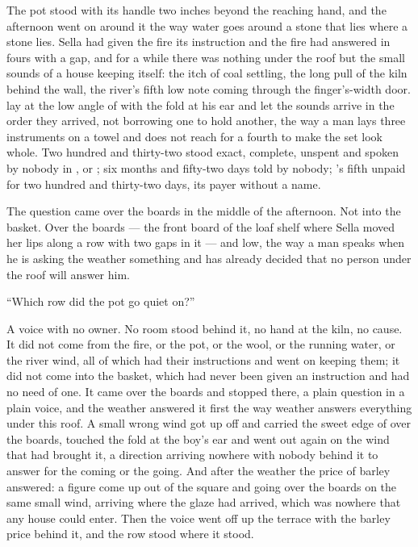 The pot stood with its handle two inches beyond the reaching hand, and the afternoon went on around it the way water goes around a stone that lies where a stone lies. Sella had given the fire its instruction and the fire had answered in fours with a gap, and for a while there was nothing under the roof but the small sounds of a house keeping itself: the itch of coal settling, the long pull of the kiln behind the wall, the river's fifth low note coming through the finger's-width door.  lay at the low angle of  with the fold at his ear and let the sounds arrive in the order they arrived, not borrowing one to hold another, the way a man lays three instruments on a towel and does not reach for a fourth to make the set look whole. Two hundred and thirty-two stood exact, complete, unspent and spoken by nobody in ,  or ; six months and fifty-two days told by nobody; 's fifth unpaid for two hundred and thirty-two days, its payer without a name.

The question came over the boards in the middle of the afternoon. Not into the basket. Over the boards --- the front board of the loaf shelf where Sella moved her lips along a row with two gaps in it --- and low, the way a man speaks when he is asking the weather something and has already decided that no person under the roof will answer him.

“Which row did the pot go quiet on?”

A voice with no owner. No room stood behind it, no hand at the kiln, no cause. It did not come from the fire, or the pot, or the wool, or the running water, or the river wind, all of which had their instructions and went on keeping them; it did not come into the basket, which had never been given an instruction and had no need of one. It came over the boards and stopped there, a plain question in a plain voice, and the weather answered it first the way weather answers everything under this roof. A small wrong wind got up off  and carried the sweet edge of  over the boards, touched the fold at the boy's ear and went out again on the wind that had brought it, a direction arriving nowhere with nobody behind it to answer for the coming or the going. And after the weather the price of barley answered: a figure come up out of the square and going over the boards on the same small wind, arriving where the glaze had arrived, which was nowhere that any house could enter. Then the voice went off up the terrace with the barley price behind it, and the row stood where it stood.

